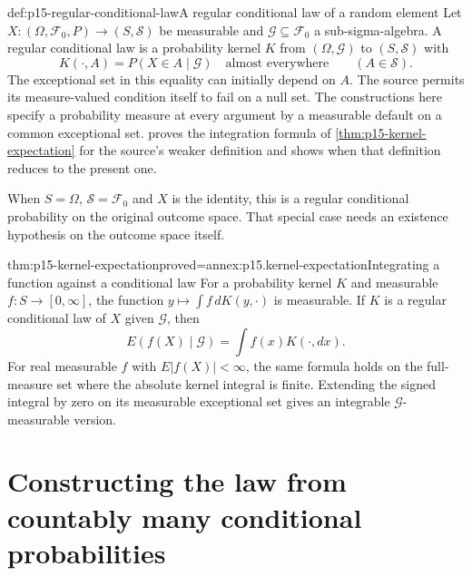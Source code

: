 \begin{hbdefinition}{def:p15-regular-conditional-law}{A regular conditional law of a random element}
Let \(X:(\Omega,\mathcal F_0,P)\to(S,\mathcal S)\) be measurable and
\(\mathcal G\subseteq\mathcal F_0\) a sub-sigma-algebra.
A regular conditional law is a probability kernel \(K\) from
\((\Omega,\mathcal G)\) to \((S,\mathcal S)\) with
\[
                      K(\cdot,A)=P(X\in A\mid\mathcal G)
                                  \quad\text{almost everywhere}
                                      \qquad(A\in\mathcal S).
\]
The exceptional set in this equality can initially depend on \(A\).
The source permits its measure-valued condition itself to fail on a null
set. The constructions here specify a probability measure at every
argument by a measurable default on a common exceptional set.
 proves the integration formula of
\cref{thm:p15-kernel-expectation} for the source's weaker definition and
shows when that definition reduces to the present one.

When \(S=\Omega\), \(\mathcal S=\mathcal F_0\) and \(X\) is the identity,
this is a regular conditional probability on the original outcome space.
That special case needs an existence hypothesis on the outcome space itself.
\end{hbdefinition}

\begin{hbtheorem}{thm:p15-kernel-expectation}{proved=annex:p15.kernel-expectation}{Integrating a function against a conditional law}
For a probability kernel \(K\) and measurable \(f:S\to[0,\infty]\),
the function \(y\mapsto\int f\,dK(y,\cdot)\) is measurable.
If \(K\) is a regular conditional law of \(X\) given \(\mathcal G\), then
\[
                         E(f(X)\mid\mathcal G)
                              =\int f(x)K(\cdot,dx).
\]
For real measurable \(f\) with \(E|f(X)|<\infty\), the same formula
holds on the full-measure set where the absolute kernel integral is
finite. Extending the signed integral by zero on its measurable
exceptional set gives an integrable \(\mathcal G\)-measurable version.
\end{hbtheorem}

\section{Constructing the law from countably many conditional probabilities}
\label{sec:p15-conditional-cdf-construction}

